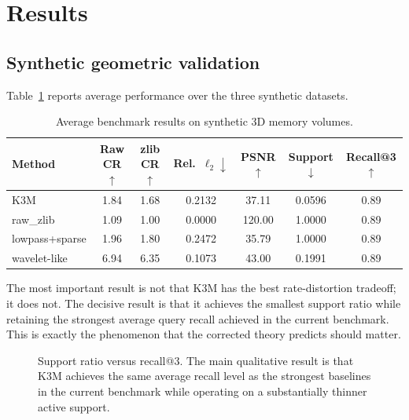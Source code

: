 \documentclass[11pt]{article}
\begin{document}
\section{Results}
\subsection{Synthetic geometric validation}
Table~\ref{tab:summary} reports average performance over the three synthetic datasets.

\begin{table}[t]
\centering
\caption{Average benchmark results on synthetic 3D memory volumes.}
\label{tab:summary}
\begin{tabular}{lcccccc}
\toprule
Method & Raw CR$\uparrow$ & zlib CR$\uparrow$ & Rel.\ $\ell_2\downarrow$ & PSNR$\uparrow$ & Support$\downarrow$ & Recall@3$\uparrow$ \\
\midrule
K3M & 1.84 & 1.68 & 0.2132 & 37.11 & 0.0596 & 0.89 \\
raw\_zlib & 1.09 & 1.00 & 0.0000 & 120.00 & 1.0000 & 0.89 \\
lowpass+sparse & 1.96 & 1.80 & 0.2472 & 35.79 & 1.0000 & 0.89 \\
wavelet-like & 6.94 & 6.35 & 0.1073 & 43.00 & 0.1991 & 0.89 \\
\bottomrule
\end{tabular}
\end{table}

The most important result is not that K3M has the best rate-distortion tradeoff; it does not. The decisive result is that it achieves the smallest support ratio while retaining the strongest average query recall achieved in the current benchmark. This is exactly the phenomenon that the corrected theory predicts should matter.

\begin{figure}[t]
\centering
{}
\caption{Support ratio versus recall@3. The main qualitative result is that K3M achieves the same average recall level as the strongest baselines in the current benchmark while operating on a substantially thinner active support.}
\label{fig:support_recall_tradeoff}
\end{figure}
\end{document}
